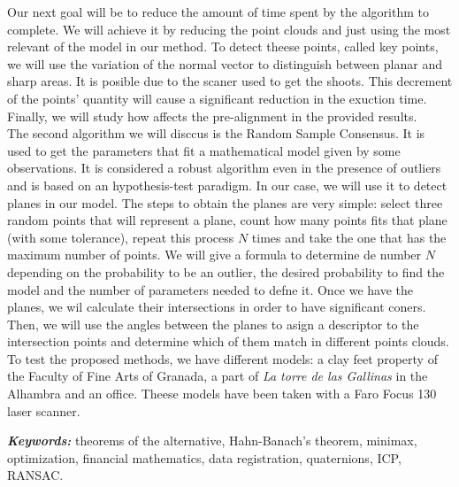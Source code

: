 Our next goal will be to reduce the amount of time spent by the algorithm to complete. We will achieve it by reducing the point clouds and just using the most relevant of the model in our method. To detect theese points, called key points, we will use the variation of the normal vector to distinguish between planar and sharp areas. It is posible due to the scaner used to get the shoots. This decrement of the points' quantity will cause a significant reduction in the exuction time. Finally, we will study how affects the pre-alignment in the provided results.  \\

The second algorithm we will disccus is the Random Sample Consensus. It is used to get the parameters that fit a mathematical model given by some observations. It is considered a robust algorithm even in the presence of outliers and is based on an hypothesis-test paradigm. In our case, we will use it to detect planes in our model. The steps to obtain the planes are very simple: select three random points that will represent a plane, count how many points fits that plane (with some tolerance), repeat this process $ N $ times and take the one that has the maximum number of points. We will give a formula to determine de number $ N $ depending on the probability to be an outlier, the desired probability to find the model and the number of parameters needed to defne it. Once we have the planes, we wil calculate their intersections in order to have significant coners. Then, we will use the angles between the planes to asign a descriptor to the intersection points and determine which of them match in different points clouds.\\

To test the proposed methods, we have different models: a clay feet property of the Faculty of Fine Arts of Granada, a part of \textit{La torre de las Gallinas} in the Alhambra and an office. Theese models have been taken with a Faro Focus 130 laser scanner. \\

\providecommand{\keywords}[1]
{
	\small	
	\textbf{\textit{Keywords: }} #1
}
\keywords{theorems of the alternative, Hahn-Banach's theorem, minimax, optimization, financial mathematics, data registration, quaternions, ICP, RANSAC.}